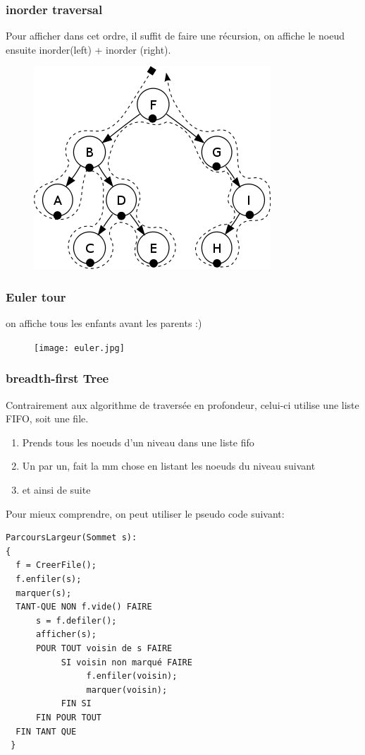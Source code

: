 \documentclass[a4paper]{article}
\begin{document}
\subsubsection{inorder traversal}
Pour afficher dans cet ordre, il suffit de faire une récursion, on affiche le noeud ensuite inorder(left) + inorder (right).

\begin{figure}[!h]
\begin{center}
\includegraphics[scale=0.4]{inorder.png}
\end{center}
\end{figure}


\subsubsection{Euler tour}
on affiche tous les enfants avant les parents :)
\begin{center}
\begin{figure}[!h]
\texttt{[image: euler.jpg]}
\end{figure}
\end{center}

\subsubsection{breadth-first Tree}
Contrairement aux algorithme de traversée en profondeur, celui-ci utilise une liste FIFO, soit une file. \\
\begin{enumerate}
\item Prends tous les noeuds d'un niveau dans une liste fifo
\item Un par un, fait la mm chose en listant les noeuds du niveau suivant
\item et ainsi de suite
\end{enumerate}
Pour mieux comprendre, on peut utiliser le pseudo code suivant:
\begin{verbatim}
ParcoursLargeur(Sommet s):
{
  f = CreerFile();
  f.enfiler(s);
  marquer(s);
  TANT-QUE NON f.vide() FAIRE
      s = f.defiler();
      afficher(s);    
      POUR TOUT voisin de s FAIRE
           SI voisin non marqué FAIRE
                f.enfiler(voisin);
                marquer(voisin);
           FIN SI
      FIN POUR TOUT 
  FIN TANT QUE       
 }
\end{verbatim}
\end{document}

